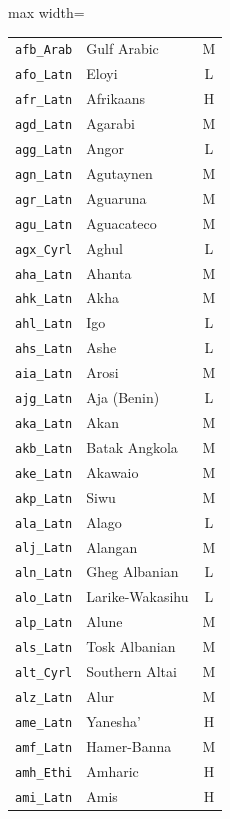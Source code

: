 {\begin{adjustbox}{max width=\textwidth}
\begin{tabular}{llc}
        \texttt{afb\_Arab} & Gulf Arabic & M \\
        \texttt{afo\_Latn} & Eloyi & L \\
        \texttt{afr\_Latn} & Afrikaans & H \\
        \texttt{agd\_Latn} & Agarabi & M \\
        \texttt{agg\_Latn} & Angor & L \\
        \texttt{agn\_Latn} & Agutaynen & M \\
        \texttt{agr\_Latn} & Aguaruna & M \\
        \texttt{agu\_Latn} & Aguacateco & M \\
        \texttt{agx\_Cyrl} & Aghul & L \\
        \texttt{aha\_Latn} & Ahanta & M \\
        \texttt{ahk\_Latn} & Akha & M \\
        \texttt{ahl\_Latn} & Igo & L \\
        \texttt{ahs\_Latn} & Ashe & L \\
        \texttt{aia\_Latn} & Arosi & M \\
        \texttt{ajg\_Latn} & Aja (Benin) & L \\
        \texttt{aka\_Latn} & Akan & M \\
        \texttt{akb\_Latn} & Batak Angkola & M \\
        \texttt{ake\_Latn} & Akawaio & M \\
        \texttt{akp\_Latn} & Siwu & M \\
        \texttt{ala\_Latn} & Alago & L \\
        \texttt{alj\_Latn} & Alangan & M \\
        \texttt{aln\_Latn} & Gheg Albanian & L \\
        \texttt{alo\_Latn} & Larike-Wakasihu & L \\
        \texttt{alp\_Latn} & Alune & M \\
        \texttt{als\_Latn} & Tosk Albanian & M \\
        \texttt{alt\_Cyrl} & Southern Altai & M \\
        \texttt{alz\_Latn} & Alur & M \\
        \texttt{ame\_Latn} & Yanesha' & H \\
        \texttt{amf\_Latn} & Hamer-Banna & M \\
        \texttt{amh\_Ethi} & Amharic & H \\
        \texttt{ami\_Latn} & Amis & H \\

\end{tabular}
\end{adjustbox}}
